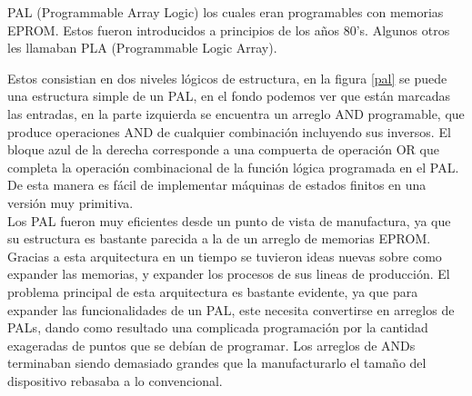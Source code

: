 \documentclass[twoside,spanish,ESP,MSc]{plantillaLabUPV}
\theoremstyle{definition}
\begin{document}


PAL (Programmable Array Logic) los cuales eran programables con memorias EPROM. Estos fueron introducidos a principios de los años 80's. Algunos otros les llamaban PLA (Programmable Logic Array).

Estos consistian en dos niveles lógicos de estructura, en la figura \ref{pal} se puede una estructura simple de un PAL, en el fondo podemos ver que están marcadas las entradas, en la parte izquierda se encuentra un arreglo AND programable, que produce operaciones AND de cualquier combinación incluyendo sus inversos. El bloque azul de la derecha corresponde a una compuerta de operación OR que completa la operación combinacional de la función lógica programada en el PAL. De esta manera es fácil de implementar máquinas de estados finitos en una versión muy primitiva.\\

Los PAL fueron muy eficientes desde un punto de vista de manufactura, ya que su estructura es bastante parecida a la de un arreglo de memorias EPROM. Gracias a esta arquitectura en un tiempo se tuvieron ideas nuevas sobre como expander las memorias, y expander los procesos de sus lineas de producción. El problema principal de esta arquitectura es bastante evidente, ya que para expander las funcionalidades de un PAL, este necesita convertirse en arreglos de PALs, dando como resultado una complicada programación por la cantidad exageradas de puntos que se debían de programar. Los arreglos de ANDs terminaban siendo demasiado grandes que la manufacturarlo el tamaño del dispositivo rebasaba a lo convencional. \\
\end{document}
